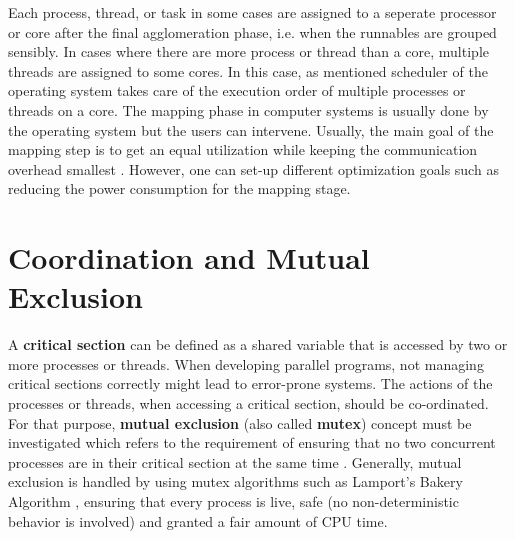 \begin{itemize}
	Each process, thread, or task in some cases are assigned to a seperate processor or core after the final agglomeration phase, i.e. when the runnables are grouped sensibly. In cases where there are more process or thread than a core, multiple threads are assigned to some cores. In this case, as mentioned scheduler of the operating system takes care of the execution order of multiple processes or threads on a core. The mapping phase in computer systems is usually done by the operating system but the users can intervene. Usually, the main goal of the mapping step is to get an equal utilization while keeping the communication overhead smallest \cite{springerparallel} \cite{lukas1}. However, one can set-up different optimization goals such as reducing the power consumption for the mapping stage.
\end{itemize}

\section{Coordination and Mutual Exclusion} \label{coordinationc} %
A \textbf{critical section} can be defined as a shared variable that is accessed by two or more processes or threads. When developing parallel programs, not managing critical sections correctly might lead to error-prone systems. The actions of the processes or threads, when accessing a critical section, should be co-ordinated. For that purpose, \textbf{mutual exclusion} (also called \textbf{mutex}) concept must be investigated which refers to the requirement of ensuring that no two concurrent processes are in their critical section at the same time \cite{lukas1}. Generally, mutual exclusion is handled by using mutex algorithms such as Lamport's Bakery Algorithm \cite{lukas1}, ensuring that every process is live, safe (no non-deterministic behavior is involved) and granted a fair amount of CPU time.

